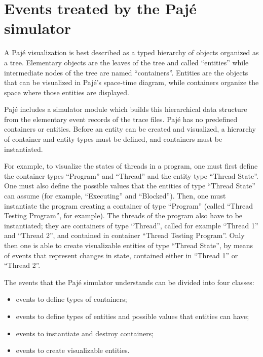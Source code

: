 \section{Events treated by the Pajé simulator} %
\label{sec:generic}

A Pajé visualization is best described as a typed hierarchy of objects
organized as a tree. Elementary objects are the leaves of the tree and
called ``entities'' while intermediate nodes of the tree are named
``containers''. 
Entities are the objects that can be visualized in Pajé's space-time diagram,
while containers organize the space where those entities are displayed.

Pajé includes a simulator module which builds this hierarchical data
structure from the elementary event records of the trace files. 
Pajé has no
predefined containers or entities. 
Before an entity can be created and visualized, a hierarchy of container and
entity types must be defined, and containers must be instantiated.

For example, to visualize the states of threads in a program, one must
first define the container types ``Program'' and ``Thread'' and the entity
type ``Thread State''.  One must also define the possible values that
the entities of type ``Thread State'' can assume (for example,
``Executing'' and ``Blocked'').  Then, one must instantiate the program
creating a container of type ``Program'' (called ``Thread Testing
Program'', for example).  The threads of the program also have to be
instantiated; they are containers of type ``Thread'', called for example
``Thread 1''
and ``Thread 2'', and contained in container ``Thread Testing Program''.
Only then one is able to create visualizable entities of type ``Thread
State'', by means of events that represent changes in state, contained
either in ``Thread 1'' or ``Thread 2''.


The events that the Pajé simulator understands can be divided into four classes:
\begin{itemize}

\item events to define types of containers;
\item events to define types of entities and possible
values that entities can have; 
\item events to instantiate and destroy containers;
\item events to create visualizable entities.
\end{itemize}

